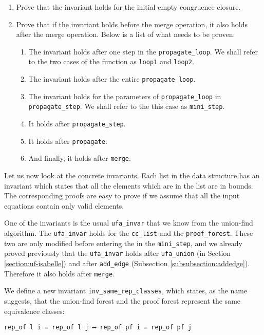 \begin{enumerate}
	\item Prove that the invariant holds for the initial empty congruence closure.

	\item Prove that if the invariant holds before the merge operation, it also holds after the merge operation. Below is a list of what needs to be proven:
    \begin{enumerate}
        \item The invariant holds after one step in the \lstinline{propagate_loop}. We shall refer to the two cases of the function as \lstinline{loop1} and \lstinline{loop2}.
    	\item The invariant holds after the entire \lstinline{propagate_loop}.
    	\item The invariant holds for the parameters of \lstinline{propagate_loop} in \lstinline{propagate_step}. We shall refer to the this case as \lstinline{mini_step}.
    	\item It holds after \lstinline{propagate_step}.
    	\item It holds after \lstinline{propagate}.
    	\item And finally, it holds after \lstinline{merge}.
    \end{enumerate}
\end{enumerate}

Let us now look at the concrete invariants. Each list in the data structure has an invariant which states that all the elements which are in the list are in bounds. The corresponding proofs are easy to prove if we assume that all the input equations contain only valid elements.

One of the invariants is the usual \lstinline{ufa_invar} that we know from the union-find algorithm. The \lstinline{ufa_invar} holds for the \lstinline{cc_list} and the \lstinline{proof_forest}. These two are only modified before entering the in the \lstinline{mini_step}, and we already proved previously that the \lstinline{ufa_invar} holds after \lstinline{ufa_union} (in Section \ref{section:uf-isabelle}) and after \lstinline{add_edge} (Subsection \ref{subsubsection:addedge}). Therefore it also holds after \lstinline{merge}.

We define a new invariant \lstinline{inv_same_rep_classes}, which states, as the name suggests, that the union-find forest and the proof forest represent the same equivalence classes:

\begin{lstlisting}
rep_of l i = rep_of l j ⟷ rep_of pf i = rep_of pf j
\end{lstlisting}

